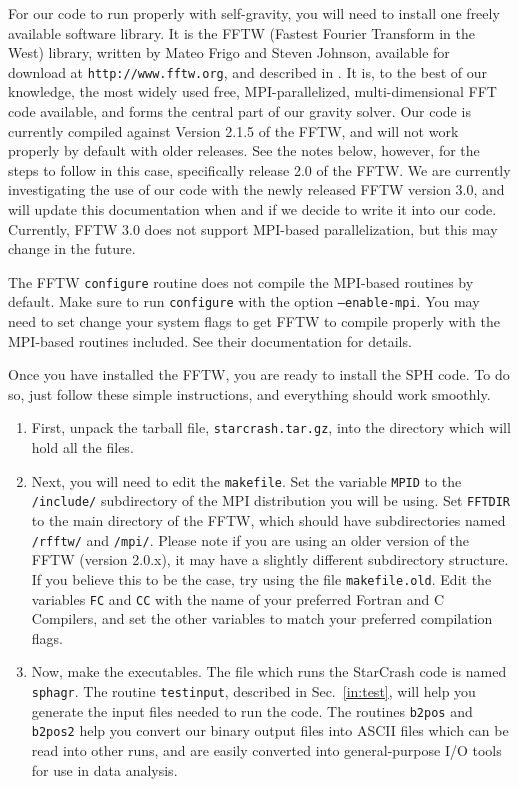 For our code to run properly with self-gravity, you
will need to install one freely available software library.  It is the
FFTW (Fastest Fourier Transform in the West) 
library, written by Mateo Frigo and Steven Johnson, available for
download at {\tt http://www.fftw.org}, and described in \citet{fftw2,fftw1}.  
It is, to the best of our
knowledge, the most widely used free, MPI-parallelized,
multi-dimensional FFT code available, and forms the central part of
our gravity solver.  Our code is currently compiled 
against Version 2.1.5 of the FFTW, and will not work properly by
default with older releases.  See the notes below, however, for the
steps to follow in this case, specifically release 2.0 of the FFTW.   
We are currently investigating the use
of our code with the newly released FFTW version 3.0, and will update
this documentation when and if we decide to write it into our code.  Currently,
FFTW 3.0 does not support MPI-based parallelization, but this may
change in the future.  

The FFTW {\tt configure} routine does not compile the MPI-based
routines by default.  Make sure to run {\tt configure} with the option
{\tt --enable-mpi}.  You may need to set change your system flags to
get FFTW to compile properly with the MPI-based routines included.
See their documentation for details.

Once you have installed the FFTW, you are ready to install the SPH code.  To
do so, just follow these simple instructions, and everything should
work smoothly.

\begin{enumerate}
\item First, unpack the tarball file, {\tt starcrash.tar.gz}, into the
directory which will hold all the files. 
\item Next, you will need to edit the {\tt makefile}.  Set the
variable {\tt MPID} to the {\tt /include/} subdirectory of the MPI
distribution you will be using.  Set {\tt FFTDIR} to the main
directory of the FFTW, which should have subdirectories named {\tt
/rfftw/} and {\tt /mpi/}.  Please note if you are using an older
version of the FFTW (version 2.0.x), it may have a slightly different subdirectory
structure.  If you believe this to be the case, try using the file
{\tt makefile.old}.  Edit the variables {\tt FC} and {\tt CC} with the
name of your preferred Fortran and C Compilers, and set the other
variables to match your preferred compilation flags.   
\item Now, make the executables.  The file which runs the StarCrash
code is named {\tt sphagr}.  The routine {\tt testinput}, described in
Sec.~\ref{in:test}, will help you generate the input files needed to
run the code.  The routines {\tt b2pos} and {\tt b2pos2} help you
convert our binary output files into ASCII files which can be read
into other runs, and are easily converted into general-purpose I/O
tools for use in data analysis. 
\end{enumerate}

